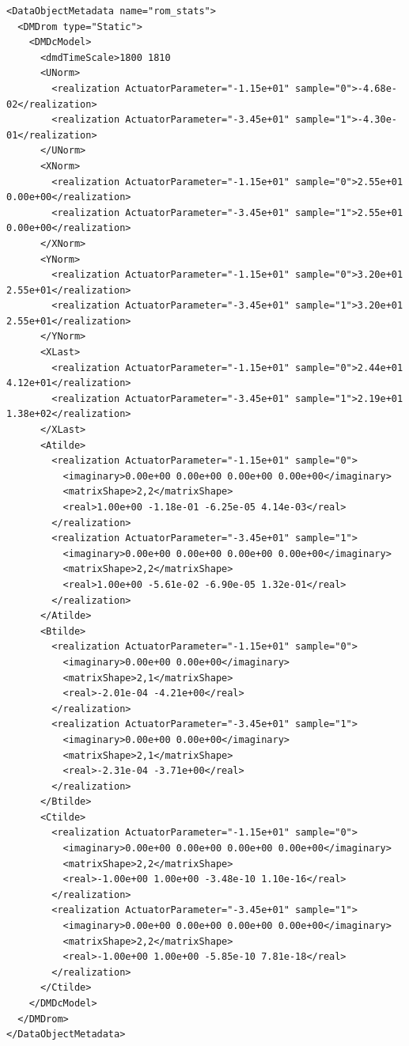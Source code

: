 \begin{lstlisting}[style=XML,morekeywords={anAttribute}, 
  caption=Parameterized External Matrices File Example., label=lst:ParaExtXMLExample]
<DataObjectMetadata name="rom_stats">
  <DMDrom type="Static">
    <DMDcModel>
      <dmdTimeScale>1800 1810
      <UNorm>
        <realization ActuatorParameter="-1.15e+01" sample="0">-4.68e-02</realization>
        <realization ActuatorParameter="-3.45e+01" sample="1">-4.30e-01</realization>
      </UNorm>
      <XNorm>
        <realization ActuatorParameter="-1.15e+01" sample="0">2.55e+01 0.00e+00</realization>
        <realization ActuatorParameter="-3.45e+01" sample="1">2.55e+01 0.00e+00</realization>
      </XNorm>  
      <YNorm>
        <realization ActuatorParameter="-1.15e+01" sample="0">3.20e+01 2.55e+01</realization>
        <realization ActuatorParameter="-3.45e+01" sample="1">3.20e+01 2.55e+01</realization>
      </YNorm>
      <XLast>
        <realization ActuatorParameter="-1.15e+01" sample="0">2.44e+01 4.12e+01</realization>
        <realization ActuatorParameter="-3.45e+01" sample="1">2.19e+01 1.38e+02</realization>
      </XLast>
      <Atilde>
        <realization ActuatorParameter="-1.15e+01" sample="0">
          <imaginary>0.00e+00 0.00e+00 0.00e+00 0.00e+00</imaginary>
          <matrixShape>2,2</matrixShape>
          <real>1.00e+00 -1.18e-01 -6.25e-05 4.14e-03</real>
        </realization>
        <realization ActuatorParameter="-3.45e+01" sample="1">
          <imaginary>0.00e+00 0.00e+00 0.00e+00 0.00e+00</imaginary>
          <matrixShape>2,2</matrixShape>
          <real>1.00e+00 -5.61e-02 -6.90e-05 1.32e-01</real>
        </realization>
      </Atilde>
      <Btilde>
        <realization ActuatorParameter="-1.15e+01" sample="0">
          <imaginary>0.00e+00 0.00e+00</imaginary>
          <matrixShape>2,1</matrixShape>
          <real>-2.01e-04 -4.21e+00</real>
        </realization>
        <realization ActuatorParameter="-3.45e+01" sample="1">
          <imaginary>0.00e+00 0.00e+00</imaginary>
          <matrixShape>2,1</matrixShape>
          <real>-2.31e-04 -3.71e+00</real>
        </realization>
      </Btilde>
      <Ctilde>
        <realization ActuatorParameter="-1.15e+01" sample="0">
          <imaginary>0.00e+00 0.00e+00 0.00e+00 0.00e+00</imaginary>
          <matrixShape>2,2</matrixShape>
          <real>-1.00e+00 1.00e+00 -3.48e-10 1.10e-16</real>
        </realization>
        <realization ActuatorParameter="-3.45e+01" sample="1">
          <imaginary>0.00e+00 0.00e+00 0.00e+00 0.00e+00</imaginary>
          <matrixShape>2,2</matrixShape>
          <real>-1.00e+00 1.00e+00 -5.85e-10 7.81e-18</real>
        </realization>
      </Ctilde>
    </DMDcModel>
  </DMDrom> 
</DataObjectMetadata>
\end{lstlisting}

